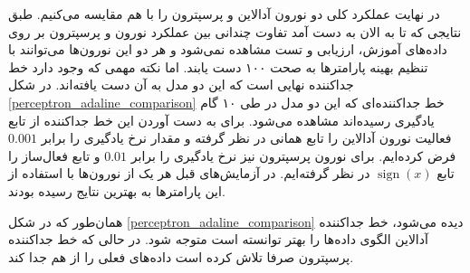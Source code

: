 \documentclass[12pt, a4paper]{article}
\DeclareMathOperator{\sign}{sign}
\begin{document}
در نهایت عملکرد کلی دو نورون آدالاین و پرسپترون را با هم مقایسه می‌کنیم.
طبق نتایجی که تا به الان به دست آمد تفاوت چندانی بین عملکرد نورون و پرسپترون بر روی داده‌های آموزش، ارزیابی
و تست مشاهده نمی‌شود و هر دو این نورون‌ها می‌توانند با تنظیم بهینه پارامتر‌ها به صحت ۱۰۰ دست یابند. اما نکته
مهمی که وجود دارد خط جداکننده نهایی است که این دو مدل به آن دست یافته‌اند. در شکل \ref{perceptron_adaline_comparison}
خط جداکننده‌ای که این دو مدل در طی ۱۰ گام یادگیری رسیده‌اند مشاهده می‌شود. برای به دست آوردن
این خط جداکننده از تابع فعالیت نورون آدالاین را تابع همانی در نظر گرفته و مقدار نرخ یادگیری را برابر $0.001$
فرض کرده‌ایم. برای نورون پرسپترون نیز نرخ یادگیری را برابر $0.01$ و تابع فعال‌ساز را تابع $\sign(x)$ در نظر گرفته‌ایم.
در آزمایش‌های قبل هر یک از نورون‌ها با استفاده از این پارامتر‌ها به بهترین نتایج رسیده بودند.

همان‌طور که در شکل \ref{perceptron_adaline_comparison} دیده می‌شود، خط جداکننده آدالاین الگوی داده‌ها را
بهتر توانسته‌ است متوجه شود. در حالی که خط جداکننده پرسپترون صرفا تلاش کرده است داده‌های فعلی را از هم
جدا کند.

\vspace{.5cm}
\end{document}

